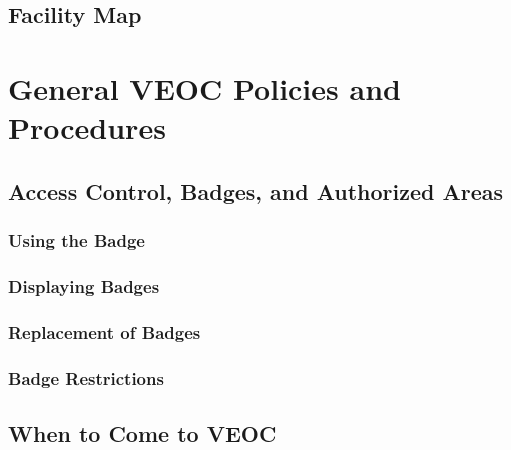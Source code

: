 \documentclass[pdflatex,letterpaper,twoside,12pt]{book}
\begin{document}
\section{Facility Map}


\chapter{General VEOC Policies and Procedures}

\section{Access Control, Badges, and Authorized Areas}

\subsection{Using the Badge}

\subsection{Displaying Badges}

\subsection{Replacement of Badges}

\subsection{Badge Restrictions}


\section{When to Come to VEOC}

\end{document}
